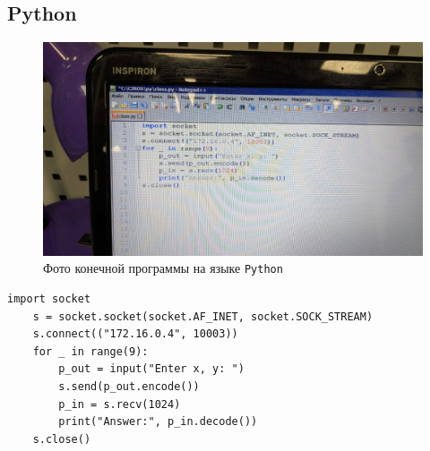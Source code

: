 \documentclass[a4paper, 12pt]{article}
\begin{document}
    \subsection{Python}
    \begin{figure}[H]
        \centering
        \includegraphics[scale=0.36]{code2.jpg}
        \captionsetup{skip=0pt}
        \caption{Фото конечной программы на языке \texttt{Python}}
        \label{fig:codephoto2}
    \end{figure}
    \begin{lstlisting}[style=python, label=code2, caption={Листинг конечной программы на языке \texttt{Python}}]
    import socket
    s = socket.socket(socket.AF_INET, socket.SOCK_STREAM)
    s.connect(("172.16.0.4", 10003))
    for _ in range(9):
        p_out = input("Enter x, y: ")
        s.send(p_out.encode())
        p_in = s.recv(1024)
        print("Answer:", p_in.decode())
    s.close()
    \end{lstlisting}
\end{document}
